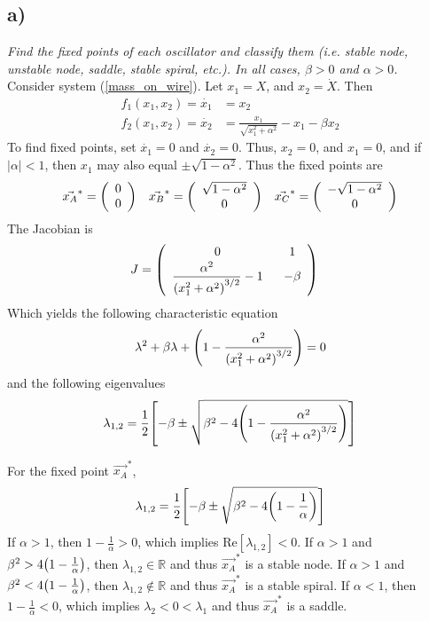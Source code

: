 \documentclass[12pt]{article}
\begin{document}
\subsection*{ a)}
\emph{Find the fixed points of each oscillator and classify them (i.e. stable node, unstable node, saddle, stable spiral, etc.). In all cases, $\beta > 0$ and $\alpha > 0$.} \\

Consider system (\ref{mass_on_wire}). Let $x_1 = X$, and $x_2 = \dot{X}$.  Then
\begin{align*}
	f_1(x_1, x_2) = \dot{x_1} &= x_2 \\[.05cm]
	f_2(x_1, x_2) = \dot{x_2} &= \frac{x_1}{\sqrt{x_1^2 + \alpha^2}} - x_1 - \beta x_2
\end{align*}
To find fixed points, set $\dot{x_1} = 0$ and $\dot{x_2} = 0$.  Thus, $x_2 = 0$, and $x_1 = 0$, and if $|\alpha| < 1$, then $x_1$ may also equal $\pm\sqrt{1 - \alpha^2}$.  Thus the fixed points are
\begin{align*}
	\vec{x_A}^* = \qty(\begin{array}{cc}0 \\ 0\end{array})\ \ \ \vec{x_B}^* = \qty(\begin{array}{cc}\sqrt{1 - \alpha^2} \\ 0\end{array})\ \ \ \vec{x_C}^* = \qty(\begin{array}{cc}-\sqrt{1 - \alpha^2} \\ 0\end{array})
\end{align*}
The Jacobian is
\begin{align*}
	J &= \qty(\begin{array}{cc}
		0\ &\ 1 \\[.05cm]
		\dfrac{\alpha^2}{\qty(x_1^2 + \alpha^2)^{3/2}} - 1\ &\ -\beta
	\end{array})
\end{align*}
Which yields the following characteristic equation
\begin{align*}
	\lambda^2 + \beta\lambda + \qty(1 - \frac{\alpha^2}{\qty(x_1^2 + \alpha^2)^{3/2}}) = 0
\end{align*}
and the following eigenvalues
\begin{align*}
	\lambda_{1,2} = \frac{1}{2}\qty[-\beta \pm \sqrt{\beta^2 - 4\qty(1 - \frac{\alpha^2}{\qty(x_1^2 + \alpha^2)^{3/2}})}]
\end{align*}

For the fixed point $\vec{x_A}^*$,
\begin{align*}
	\lambda_{1,2} = \frac{1}{2}\qty[-\beta \pm \sqrt{\beta^2 - 4\qty(1 - \frac{1}{\alpha})}]
\end{align*}
If $\alpha > 1$, then $1 - \frac{1}{\alpha} > 0$, which implies $\text{Re}[\lambda_{1,2}] < 0$.  If $\alpha > 1$ and $\beta^2 > 4\qty(1 - \frac{1}{\alpha})$, then $\lambda_{1,2} \in \mathbb{R}$ and thus $\vec{x_A}^*$ is a stable node.  If $\alpha > 1$ and $\beta^2 < 4\qty(1 - \frac{1}{\alpha})$, then $\lambda_{1,2} \not\in \mathbb{R}$ and thus $\vec{x_A}^*$ is a stable spiral.  If $\alpha < 1$, then $1 - \frac{1}{\alpha} < 0$, which implies $\lambda_2 < 0 < \lambda_1$ and thus $\vec{x_A}^*$ is a saddle.
\end{document}
